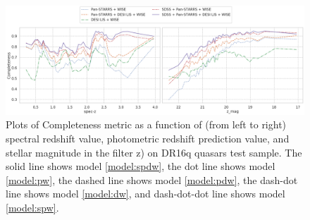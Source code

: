 \documentclass[fleqn,usenatbib]{mnras}
\begin{document}
\begin{figure}
    \centering
    \includegraphics[width=0.9\linewidth]{images/metrics-comp-dr16q.png}
    \caption{Plots of Completeness metric as a function of (from left to right) spectral redshift value, photometric redshift prediction value, and stellar magnitude in the filter z) on DR16q quasars test sample. The solid line shows model \ref{model:spdw}, the dot line shows model \ref{model:pw}, the dashed line shows model \ref{model:pdw}, the dash-dot line shows model \ref{model:dw}, and dash-dot-dot line shows model \ref{model:spw}.}
    \label{fig:metrics-comp-dr16q}
\end{figure}
\end{document}
